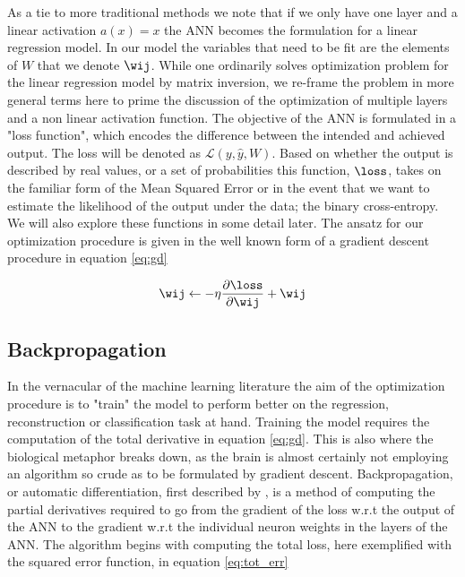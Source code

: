 \noindent As a tie to more traditional methods we note that if we only have one layer and a linear activation $a(x) = x$ the ANN becomes the formulation for a linear regression model. In our model the variables that need to be fit are the elements of $W$ that we denote $\wij$. While one ordinarily solves optimization problem for the linear regression model by matrix inversion, we re-frame the problem in more general terms here to prime the discussion of the optimization of multiple layers and a non linear activation function. The objective of the ANN is formulated in a "loss function", which encodes the difference between the intended and achieved output. The loss will be denoted as $\mathcal{L}(y, \hat{y}, W)$. Based on whether the output is described by real values, or a set of probabilities this function, $\loss$, takes on the familiar form of the Mean Squared Error or in the event that we want to estimate the likelihood of the output under the data; the binary cross-entropy. We will also explore these functions in some detail later. The ansatz for our optimization procedure is given in the well known form of a gradient descent procedure in equation \ref{eq:gd}

\begin{equation}\label{eq:gd}
	\wij \leftarrow -\eta \frac{\partial \loss}{\partial \wij} + \wij 
\end{equation}

\subsection{Backpropagation}

In the vernacular of the machine learning literature the aim of the optimization procedure is to "train" the model to perform better on the regression, reconstruction or classification task at hand. Training the model requires the computation of the total derivative in equation \ref{eq:gd}. This is also where the biological metaphor breaks down, as the brain is almost certainly not employing an algorithm so crude as to be formulated by gradient descent. Backpropagation, or automatic differentiation, first described by \citet{Linnainmaa1976}, is a method of computing the partial derivatives required to go from the gradient of the loss w.r.t the output of the ANN to the gradient w.r.t the individual neuron weights in the layers of the ANN. The algorithm begins with computing the total loss, here exemplified with the squared error function, in equation \ref{eq:tot_err}

